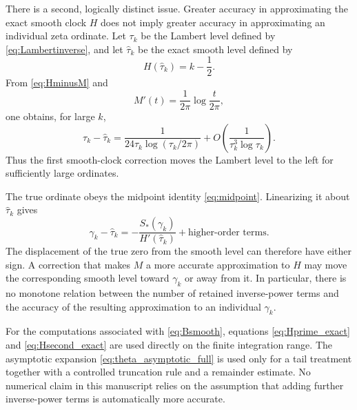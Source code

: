 \documentclass[11pt]{amsart}
\numberwithin{equation}{section}
\theoremstyle{definition}
\theoremstyle{remark}
\begin{document}
There is a second, logically distinct issue.  Greater accuracy in approximating the exact smooth clock $H$ does not imply greater accuracy in approximating an individual zeta ordinate.  Let $\tau_k$ be the Lambert level defined by \eqref{eq:Lambertinverse}, and let $\widehat\tau_k$ be the exact smooth level defined by
\begin{equation}\label{eq:exact_smooth_level}
H(\widehat\tau_k)=k-\frac12.
\end{equation}
From \eqref{eq:HminusM} and
\begin{equation}\label{eq:Mprime_appendix}
M'(t)=\frac1{2\pi}\log\frac{t}{2\pi},
\end{equation}
one obtains, for large $k$,
\begin{equation}\label{eq:Lambert_exact_smooth_shift}
\tau_k-\widehat\tau_k
=\frac{1}{24\tau_k\log(\tau_k/2\pi)}
+O\!\left(\frac{1}{\tau_k^3\log\tau_k}\right).
\end{equation}
Thus the first smooth-clock correction moves the Lambert level to the left for sufficiently large ordinates.

The true ordinate obeys the midpoint identity \eqref{eq:midpoint}.  Linearizing it about $\widehat\tau_k$ gives
\begin{equation}\label{eq:true_zero_exact_smooth_shift}
\gamma_k-\widehat\tau_k
=-\frac{S_*(\gamma_k)}{H'(\widehat\tau_k)}
+\text{higher-order terms}.
\end{equation}
The displacement of the true zero from the smooth level can therefore have either sign.  A correction that makes $M$ a more accurate approximation to $H$ may move the corresponding smooth level toward $\gamma_k$ or away from it.  In particular, there is no monotone relation between the number of retained inverse-power terms and the accuracy of the resulting approximation to an individual $\gamma_k$.

For the computations associated with \eqref{eq:Bsmooth}, equations \eqref{eq:Hprime_exact} and \eqref{eq:Hsecond_exact} are used directly on the finite integration range.  The asymptotic expansion \eqref{eq:theta_asymptotic_full} is used only for a tail treatment together with a controlled truncation rule and a remainder estimate.  No numerical claim in this manuscript relies on the assumption that adding further inverse-power terms is automatically more accurate.
\end{document}
